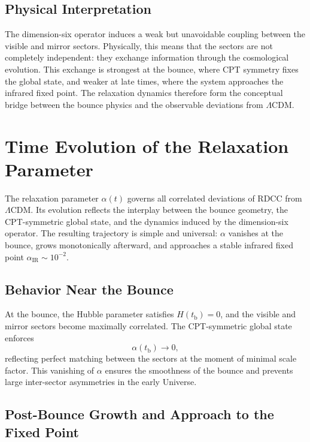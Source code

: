 \documentclass[11pt,a4paper]{article}
\begin{document}
\subsection{Physical Interpretation}

The dimension-six operator induces a weak but unavoidable coupling between the
visible and mirror sectors. Physically, this means that the sectors are not completely
independent: they exchange information through the cosmological evolution. This
exchange is strongest at the bounce, where CPT symmetry fixes the global state, and
weaker at late times, where the system approaches the infrared fixed point. The
relaxation dynamics therefore form the conceptual bridge between the bounce physics
and the observable deviations from $\Lambda$CDM.

\section{Time Evolution of the Relaxation Parameter}

The relaxation parameter $\alpha(t)$ governs all correlated deviations of RDCC from
$\Lambda$CDM. Its evolution reflects the interplay between the bounce geometry, the
CPT-symmetric global state, and the dynamics induced by the dimension-six operator.
The resulting trajectory is simple and universal: $\alpha$ vanishes at the bounce,
grows monotonically afterward, and approaches a stable infrared fixed point
$\alpha_{\mathrm{IR}} \sim 10^{-2}$.

\subsection{Behavior Near the Bounce}

At the bounce, the Hubble parameter satisfies $H(t_{\mathrm{b}})=0$, and the visible and
mirror sectors become maximally correlated. The CPT-symmetric global state enforces
\begin{equation}
    \alpha(t_{\mathrm{b}}) \to 0,
\end{equation}
reflecting perfect matching between the sectors at the moment of minimal scale factor.
This vanishing of $\alpha$ ensures the smoothness of the bounce and prevents large
inter-sector asymmetries in the early Universe.

\subsection{Post-Bounce Growth and Approach to the Fixed Point}
\end{document}
